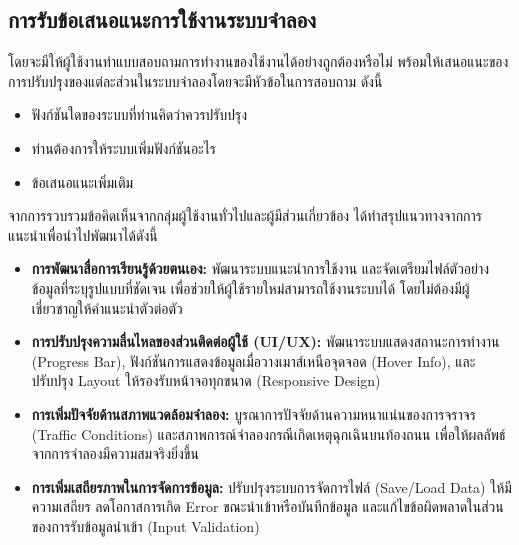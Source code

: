     \subsection{การรับข้อเสนอแนะการใช้งานระบบจำลอง}
        \begin{mypara}
            \indent โดยจะมีให้ผู้ใช้งานทำแบบสอบถามการทำงานของใช้งานได้อย่างถูกต้องหรือไม่
            พร้อมให้เสนอแนะของการปรับปรุงของแต่ละส่วนในระบบจำลองโดยจะมีหัวข้อในการสอบถาม ดังนี้
            \begin{itemize}
                \item ฟังก์ชันใดของระบบที่ท่านคิดว่าควรปรับปรุง  
                \item ท่านต้องการให้ระบบเพิ่มฟังก์ชันอะไร  
                \item ข้อเสนอแนะเพิ่มเติม  
            \end{itemize}
            \indent จากการรวบรวมข้อคิดเห็นจากกลุ่มผู้ใช้งานทั่วไปและผู้มีส่วนเกี่ยวข้อง 
            ได้ทำสรุปแนวทางจากการแนะนำเพื่อนำไปพัฒนาได้ดังนี้

            \begin{itemize}
                \item \textbf{การพัฒนาสื่อการเรียนรู้ด้วยตนเอง:} พัฒนาระบบแนะนำการใช้งาน 
                และจัดเตรียมไฟล์ตัวอย่างข้อมูลที่ระบุรูปแบบที่ชัดเจน เพื่อช่วยให้ผู้ใช้รายใหม่สามารถใช้งานระบบได้
                โดยไม่ต้องมีผู้เชี่ยวชาญให้คำแนะนำตัวต่อตัว
                \item \textbf{การปรับปรุงความลื่นไหลของส่วนติดต่อผู้ใช้ (UI/UX):} พัฒนาระบบแสดงสถานะการทำงาน (Progress Bar), 
                ฟังก์ชันการแสดงข้อมูลเมื่อวางเมาส์เหนือจุดจอด (Hover Info), และปรับปรุง Layout ให้รองรับหน้าจอทุกขนาด (Responsive Design)
                \item \textbf{การเพิ่มปัจจัยด้านสภาพแวดล้อมจำลอง:} บูรณาการปัจจัยด้านความหนาแน่นของการจราจร (Traffic Conditions)
                 และสภาพการณ์จำลองกรณีเกิดเหตุฉุกเฉินบนท้องถนน เพื่อให้ผลลัพธ์จากการจำลองมีความสมจริงยิ่งขึ้น
                \item \textbf{การเพิ่มเสถียรภาพในการจัดการข้อมูล:} ปรับปรุงระบบการจัดการไฟล์ (Save/Load Data) ให้มีความเสถียร 
                ลดโอกาสการเกิด Error ขณะนำเข้าหรือบันทึกข้อมูล และแก้ไขข้อผิดพลาดในส่วนของการรับข้อมูลนำเข้า (Input Validation)
            \end{itemize}
        \end{mypara}


